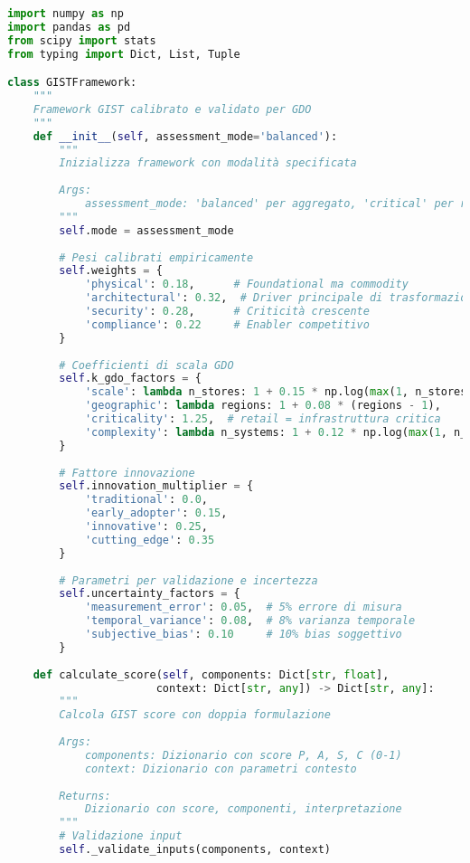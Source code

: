 \begin{lstlisting}[language=Python, caption=Classe GISTFramework Completa]
import numpy as np
import pandas as pd
from scipy import stats
from typing import Dict, List, Tuple

class GISTFramework:
    """
    Framework GIST calibrato e validato per GDO
    """
    def __init__(self, assessment_mode='balanced'):
        """
        Inizializza framework con modalità specificata
        
        Args:
            assessment_mode: 'balanced' per aggregato, 'critical' per restrittivo
        """
        self.mode = assessment_mode
        
        # Pesi calibrati empiricamente
        self.weights = {
            'physical': 0.18,      # Foundational ma commodity
            'architectural': 0.32,  # Driver principale di trasformazione
            'security': 0.28,      # Criticità crescente
            'compliance': 0.22     # Enabler competitivo
        }
        
        # Coefficienti di scala GDO
        self.k_gdo_factors = {
            'scale': lambda n_stores: 1 + 0.15 * np.log(max(1, n_stores/50)),
            'geographic': lambda regions: 1 + 0.08 * (regions - 1),
            'criticality': 1.25,  # retail = infrastruttura critica
            'complexity': lambda n_systems: 1 + 0.12 * np.log(max(1, n_systems))
        }
        
        # Fattore innovazione
        self.innovation_multiplier = {
            'traditional': 0.0,
            'early_adopter': 0.15,
            'innovative': 0.25,
            'cutting_edge': 0.35
        }
        
        # Parametri per validazione e incertezza
        self.uncertainty_factors = {
            'measurement_error': 0.05,  # 5% errore di misura
            'temporal_variance': 0.08,  # 8% varianza temporale
            'subjective_bias': 0.10     # 10% bias soggettivo
        }
    
    def calculate_score(self, components: Dict[str, float], 
                       context: Dict[str, any]) -> Dict[str, any]:
        """
        Calcola GIST score con doppia formulazione
        
        Args:
            components: Dizionario con score P, A, S, C (0-1)
            context: Dizionario con parametri contesto
            
        Returns:
            Dizionario con score, componenti, interpretazione
        """
        # Validazione input
        self._validate_inputs(components, context)
        

\end{lstlisting}
